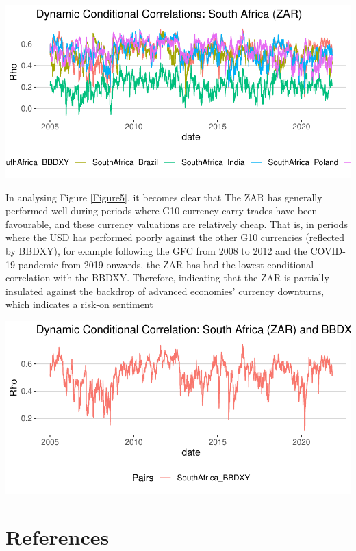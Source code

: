 \documentclass[11pt,preprint, authoryear]{elsarticle}
\let\origfigure\figure
\let\endorigfigure\endfigure
\renewenvironment{figure}[1][2] {
    \expandafter\origfigure\expandafter[H]
} {
    \endorigfigure
}
\numberwithin{equation}{section}
\numberwithin{figure}{section}
\numberwithin{table}{section}
\newlength{\cslhangindent}
\newenvironment{CSLReferences}%
  {\setlength{\parindent}{0pt}%
  \everypar{\setlength{\hangindent}{\cslhangindent}}\ignorespaces}%
  {\par}
\begin{document}
\begin{figure}[H]

{\centering \includegraphics{Question5_files/figure-latex/Cond_corr_plot-1} 

}

\caption{Dynamic Conditional Correlations: South Africa (ZAR) \label{Figure4}}\label{fig:Cond_corr_plot}
\end{figure}

In analysing Figure \ref{Figure5}, it becomes clear that The ZAR has
generally performed well during periods where G10 currency carry trades
have been favourable, and these currency valuations are relatively
cheap. That is, in periods where the USD has performed poorly against
the other G10 currencies (reflected by BBDXY), for example following the
GFC from 2008 to 2012 and the COVID-19 pandemic from 2019 onwards, the
ZAR has had the lowest conditional correlation with the BBDXY.
Therefore, indicating that the ZAR is partially insulated against the
backdrop of advanced economies' currency downturns, which indicates a
risk-on sentiment

\begin{figure}[H]

{\centering \includegraphics{Question5_files/figure-latex/Cond_corr_plot 2-1} 

}

\caption{Dynamic Conditional Correlation: South Africa (ZAR) and BBDXY \label{Figure5}}\label{fig:Cond_corr_plot 2}
\end{figure}

\newpage

\hypertarget{references}{%
\section*{References}\label{references}}

\hypertarget{refs}{}
\begin{CSLReferences}{0}{0}
\end{CSLReferences}


\end{document}
